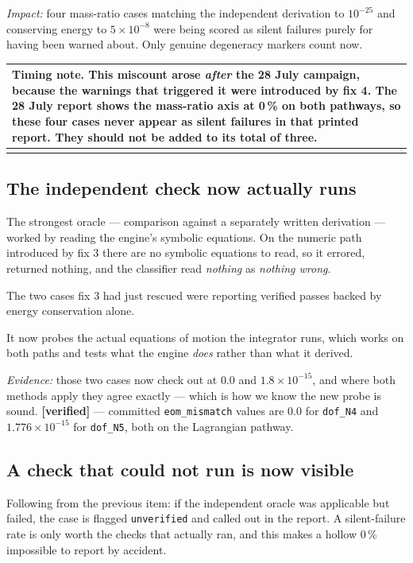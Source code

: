 \documentclass[11pt,a4paper]{article}
\makeatletter
\newenvironment{callout}
  {\par\medskip\noindent\begin{tabular}{@{}p{0.94\textwidth}@{}}
   \arrayrulecolor{warnrule}\hline\rule{0pt}{2.6ex}}
  {\\[0.8ex]\hline\arrayrulecolor{black}\end{tabular}\par\medskip}
\newcommand{\evidence}[1]{\emph{Evidence:} #1}
\newcommand{\vconf}{\textcolor{okgreen}{\textbf{[verified]}}}
\makeatother
\begin{document}
\emph{Impact:} four mass-ratio cases matching the independent derivation to
$10^{-25}$ and conserving energy to $5\times10^{-8}$ were being scored as
silent failures purely for having been warned about. Only genuine degeneracy
markers count now.

\begin{callout}
\textbf{Timing note.} This miscount arose \emph{after} the 28 July campaign,
because the warnings that triggered it were introduced by fix 4. The 28 July
report shows the mass-ratio axis at 0\,\% on both pathways, so these four cases
never appear as silent failures in that printed report. They should not be
added to its total of three.
\end{callout}

\subsection{The independent check now actually runs}

The strongest oracle --- comparison against a separately written derivation ---
worked by reading the engine's symbolic equations. On the numeric path
introduced by fix 3 there are no symbolic equations to read, so it errored,
returned nothing, and the classifier read \emph{nothing} as \emph{nothing
wrong}.

The two cases fix 3 had just rescued were reporting verified passes backed by
energy conservation alone.

It now probes the actual equations of motion the integrator runs, which works
on both paths and tests what the engine \emph{does} rather than what it
derived.

\evidence{those two cases now check out at $0.0$ and $1.8\times10^{-15}$, and
where both methods apply they agree exactly --- which is how we know the new
probe is sound.} \vconf{} --- committed \texttt{eom\_mismatch} values are
$0.0$ for \texttt{dof\_N4} and $1.776\times10^{-15}$ for \texttt{dof\_N5}, both
on the Lagrangian pathway.

\subsection{A check that could not run is now visible}

Following from the previous item: if the independent oracle was applicable but
failed, the case is flagged \texttt{unverified} and called out in the report. A
silent-failure rate is only worth the checks that actually ran, and this makes
a hollow 0\,\% impossible to report by accident.
\end{document}
